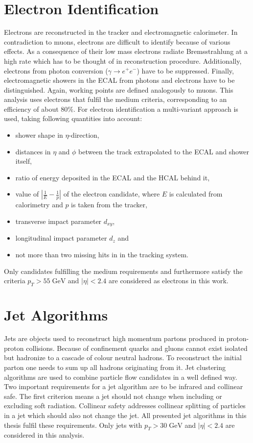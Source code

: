 \section{Electron Identification}
	Electrons are reconstructed in the tracker and electromagnetic calorimeter. In contradiction to muons, electrons are difficult to identify because of various effects. As a consequence of their low mass electrons radiate Bremsstrahlung at a high rate which has to be thought of in reconstruction procedure. Additionally, electrons from photon conversion ($\gamma \rightarrow e^+ e^-$) have to be suppressed. Finally, electromagnetic showers in the ECAL from photons and electrons have to be distinguished. Again, working points \cite{ElecID} are defined analogously to muons. This analysis uses electrons that fulfil the medium criteria, corresponding to an efficiency of about $80\%$. For electron identification a multi-variant approach is used, taking following quantities into account:
	\begin{itemize}
	\item shower shape in $\eta$-direction,
	\item distances in $\eta$ and $\phi$ between the track extrapolated to the ECAL and shower itself,
	\item ratio of energy deposited in the ECAL and the HCAL behind it,
	\item value of $|\frac{1}{E} - \frac{1}{p}|$ of the electron candidate, where $E$ is calculated from calorimetry and $p$ is taken from the tracker,
	\item transverse impact parameter $d_{xy}$,
	\item longitudinal impact parameter $d_{z}$ and
	\item not more than two missing hits in in the tracking system.
	\end{itemize}
	Only candidates fulfilling the medium requirements and furthermore satisfy the criteria $p_T > 55\;\text{GeV}$ and $|\eta| < 2.4$ are considered as electrons in this work.
\section{Jet Algorithms}
	Jets are objects used to reconstruct high momentum partons produced in proton-proton collisions. Because of confinement quarks and gluons cannot exist isolated but hadronize to a cascade of colour neutral hadrons. To reconstruct the initial parton one needs to sum up all hadrons originating from it. Jet clustering algorithms are used to combine particle flow candidates in a well defined way. Two important requirements for a jet algorithm are to be infrared and collinear safe. The first criterion means a jet should not change when including or excluding soft radiation. Collinear safety addresses collinear splitting of particles in a jet which should also not change the jet. All presented jet algorithms in this thesis fulfil these requirements. Only jets with $p_T > 30\;\text{GeV}$ and $|\eta| < 2.4$ are considered in this analysis.
	
